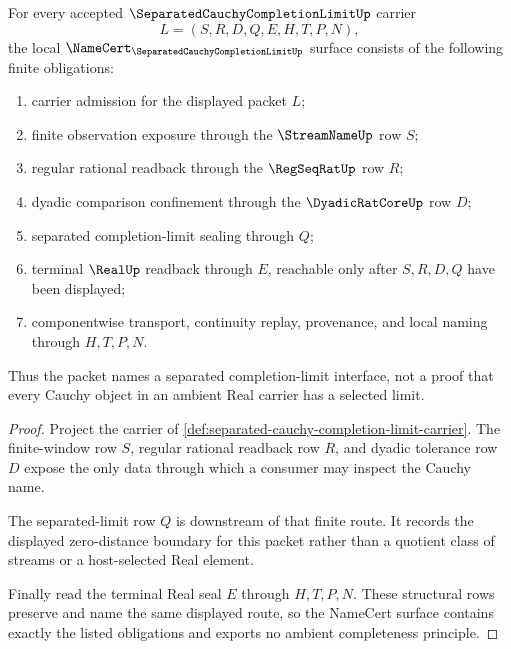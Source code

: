 \begin{theorem}
\label{thm:separated-cauchy-completion-limit-namecert-obligations}
For every accepted $\SeparatedCauchyCompletionLimitUp$ carrier
$$
L=(S,R,D,Q,E,H,T,P,N),
$$
the local $\NameCert_{\SeparatedCauchyCompletionLimitUp}$ surface consists of the following finite obligations:
\begin{enumerate}
\item carrier admission for the displayed packet $L$;
\item finite observation exposure through the $\StreamNameUp$ row $S$;
\item regular rational readback through the $\RegSeqRatUp$ row $R$;
\item dyadic comparison confinement through the $\DyadicRatCoreUp$ row $D$;
\item separated completion-limit sealing through $Q$;
\item terminal $\RealUp$ readback through $E$, reachable only after $S,R,D,Q$ have been displayed;
\item componentwise transport, continuity replay, provenance, and local naming through $H,T,P,N$.
\end{enumerate}
Thus the packet names a separated completion-limit interface, not a proof that every Cauchy object in an ambient Real carrier has a selected limit.
\end{theorem}
\begin{proof}
Project the carrier of \autoref{def:separated-cauchy-completion-limit-carrier}. The finite-window row $S$, regular rational readback row $R$, and dyadic tolerance row $D$ expose the only data through which a consumer may inspect the Cauchy name.

The separated-limit row $Q$ is downstream of that finite route. It records the displayed zero-distance boundary for this packet rather than a quotient class of streams or a host-selected Real element.

Finally read the terminal Real seal $E$ through $H,T,P,N$. These structural rows preserve and name the same displayed route, so the NameCert surface contains exactly the listed obligations and exports no ambient completeness principle.
\end{proof}

